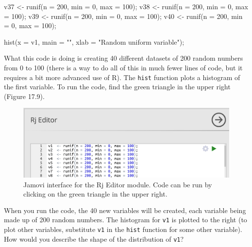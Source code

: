 \documentclass[
]{scrbook}
\newenvironment{Shaded}{\begin{snugshade}}{\end{snugshade}}
\newcommand{\AttributeTok}[1]{\textcolor[rgb]{0.77,0.63,0.00}{#1}}
\newcommand{\DecValTok}[1]{\textcolor[rgb]{0.00,0.00,0.81}{#1}}
\newcommand{\FunctionTok}[1]{\textcolor[rgb]{0.00,0.00,0.00}{#1}}
\newcommand{\NormalTok}[1]{#1}
\newcommand{\OtherTok}[1]{\textcolor[rgb]{0.56,0.35,0.01}{#1}}
\newcommand{\StringTok}[1]{\textcolor[rgb]{0.31,0.60,0.02}{#1}}
\begin{document}
\begin{Shaded}
\begin{Highlighting}[]
\NormalTok{v37 }\OtherTok{\textless{}{-}} \FunctionTok{runif}\NormalTok{(}\AttributeTok{n =} \DecValTok{200}\NormalTok{, }\AttributeTok{min =} \DecValTok{0}\NormalTok{, }\AttributeTok{max =} \DecValTok{100}\NormalTok{);}
\NormalTok{v38 }\OtherTok{\textless{}{-}} \FunctionTok{runif}\NormalTok{(}\AttributeTok{n =} \DecValTok{200}\NormalTok{, }\AttributeTok{min =} \DecValTok{0}\NormalTok{, }\AttributeTok{max =} \DecValTok{100}\NormalTok{);}
\NormalTok{v39 }\OtherTok{\textless{}{-}} \FunctionTok{runif}\NormalTok{(}\AttributeTok{n =} \DecValTok{200}\NormalTok{, }\AttributeTok{min =} \DecValTok{0}\NormalTok{, }\AttributeTok{max =} \DecValTok{100}\NormalTok{);}
\NormalTok{v40 }\OtherTok{\textless{}{-}} \FunctionTok{runif}\NormalTok{(}\AttributeTok{n =} \DecValTok{200}\NormalTok{, }\AttributeTok{min =} \DecValTok{0}\NormalTok{, }\AttributeTok{max =} \DecValTok{100}\NormalTok{);}

\FunctionTok{hist}\NormalTok{(}\AttributeTok{x =}\NormalTok{ v1, }\AttributeTok{main =} \StringTok{""}\NormalTok{, }\AttributeTok{xlab =} \StringTok{"Random uniform variable"}\NormalTok{);}
\end{Highlighting}
\end{Shaded}

What this code is doing is creating 40 different datasets of 200 random numbers from 0 to 100 (there is a way to do all of this in much fewer lines of code, but it requires a bit more advanced use of R).
The \texttt{hist} function plots a histogram of the first variable.
To run the code, find the green triangle in the upper right (Figure 17.9).

\begin{figure}
\includegraphics[width=0.8\linewidth]{img/jamovi_RjEditor} \caption{Jamovi interface for the Rj Editor module. Code can be run by clicking on the green triangle in the upper right.}\label{fig:unnamed-chunk-79}
\end{figure}

When you run the code, the 40 new variables will be created, each variable being made up of 200 random numbers.
The histogram for \texttt{v1} is plotted to the right (to plot other variables, substitute \texttt{v1} in the \texttt{hist} function for some other variable).
How would you describe the shape of the distribution of \texttt{v1}?
\end{document}
